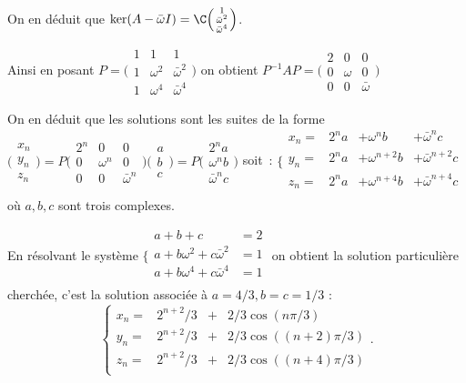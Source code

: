 {{On en déduit que $\ker(A-\bar\omega I)=\C\Big(\begin{smallmatrix}1\\\bar\omega^{2}\\\bar\omega^{4}\end{smallmatrix}\Big)$.

Ainsi en posant $P=\Big(\begin{smallmatrix}
  1&1&1\\1&\omega^{2}&\bar\omega^{2}\\1&\omega^{4}&\bar\omega^{4}\end{smallmatrix}\Big)$ on obtient
$P^{-1}AP=\Big(\begin{smallmatrix}
  2&0&0\\
  0&\omega&0\\
  0&0&\bar\omega\end{smallmatrix}\Big)$

On en déduit que les solutions sont les suites de la forme%
$\Big(\begin{smallmatrix}
  x_{n}\\
  y_{n}\\
  z_{n}  
\end{smallmatrix}\Big)=
P\Big(\begin{smallmatrix}
  2^n&0&0\\
  0&\omega^{n}&0\\
  0&0&\bar\omega^{n}\end{smallmatrix}\Big)
\Big(\begin{smallmatrix}
  a\\b\\c\end{smallmatrix}\Big)
=
P\Big(\begin{smallmatrix}2^na\\\omega^n b\\\bar\omega^nc\end{smallmatrix}\Big)
$ soit~:
$\Big\{\begin{smallmatrix}
  x_{n}=&2^na&+\omega^{n}b  &+\bar\omega^{n}c\\
  y_{n}=&2^na&+\omega^{n+2}b&+\bar\omega^{n+2}c\\
  z_{n}=&2^na&+\omega^{n+4}b&+\bar\omega^{n+4}c\\
\end{smallmatrix}$ où $a,b,c$ sont trois complexes.

En résolvant le système%
$\Big\{\begin{smallmatrix}
  a+b+c&=2\\
  a+b\omega^{2}+c\bar\omega^{2}&=1\\
  a+b\omega^{4}+c\bar\omega^{4}&=1\\
\end{smallmatrix}$
on obtient la solution particulière cherchée,  c'est la solution
associée à $a=4/3, b=c=1/3$ :
$$\left\{\begin{array}{llll}
  x_{n}=&2^{n+2}/3 &+&2/3 \cos(n\pi/3)\\
  y_{n}=&2^{n+2}/3 &+&2/3 \cos((n+2)\pi/3)\\
  z_{n}=&2^{n+2}/3 &+&2/3 \cos((n+4)\pi/3)\\
\end{array}\right..$$
}
}
